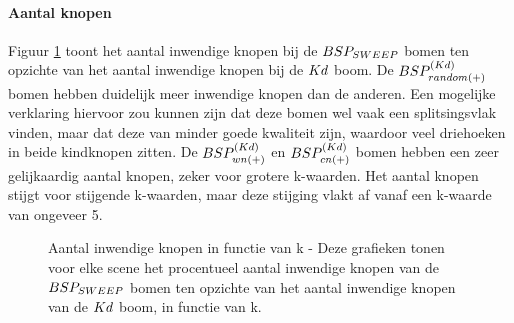 \paragraph{Aantal knopen} Figuur \ref{fig:k-knopen} toont het aantal inwendige knopen bij de $BSP_{SWEEP}$ bomen ten opzichte van het aantal inwendige knopen bij de $Kd$ boom. De $BSP^{(Kd)}_{random(+)}$ bomen hebben duidelijk meer inwendige knopen dan de anderen. Een mogelijke verklaring hiervoor zou kunnen zijn dat deze bomen wel vaak een splitsingsvlak vinden, maar dat deze van minder goede kwaliteit zijn, waardoor veel driehoeken in beide kindknopen zitten. De $BSP^{(Kd)}_{wn(+)}$ en $BSP^{(Kd)}_{cn(+)}$ bomen hebben een zeer gelijkaardig aantal knopen, zeker voor grotere k-waarden. Het aantal knopen stijgt voor stijgende k-waarden, maar deze stijging vlakt af vanaf een k-waarde van ongeveer 5.
\begin{figure}[h]
  \centering
  \begin{subfigure}[t]{.32\linewidth}
    \centering
{}
  \end{subfigure}
  \begin{subfigure}[t]{.32\linewidth}
    \centering
{}
\end{subfigure}
\begin{subfigure}[t]{.32\linewidth}
  \centering
{}
\end{subfigure}
\caption[Aantal inwendige knopen in functie van k]{Aantal inwendige knopen in functie van k - \small Deze grafieken tonen voor elke scene het procentueel aantal inwendige knopen van de $BSP_{SWEEP}$ bomen ten opzichte van het aantal inwendige knopen van de $Kd$ boom, in functie van k.}
\label{fig:k-knopen}
\end{figure}
